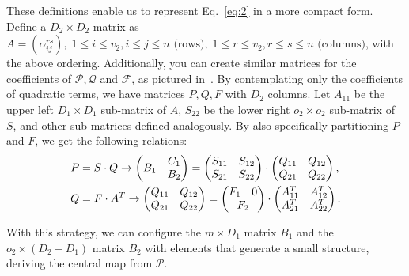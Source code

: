 \documentclass[11pt]{article}
\begin{document}
These definitions enable us to represent Eq.~\ref{eq:2} in a more compact form.
Define a $D_{2} \times D_{2}$ matrix as $A = (\alpha_{ij}^{rs}),\;
1 \leq i \leq v_{2}, i \leq j \leq n \text{ (rows)},\;
1 \leq r \leq v_{2}, r \leq s \leq n \text{ (columns)}$, with the above
ordering. Additionally, you can create similar matrices for the coefficients of
$\mathcal{P}, \mathcal{Q}$ and $\mathcal{F}$, as pictured in~\cite[Figure
7.5]{Petzoldt:phd:2013:jul}. By contemplating only the coefficients of
quadratic terms, we have matrices $P, Q, F$ with $D_{2}$ columns. Let $A_{11}$
be the upper left $D_{1} \times D_{1}$ sub-matrix of $A$, $S_{22}$ be the lower
right $o_{2} \times o_{2}$ sub-matrix of $S$, and other sub-matrices defined
analogously. By also specifically partitioning $P$ and $F$, we get the
following relations:
\begin{align}\label{eq:3}
  P &= S \cdot Q \rightarrow
  \begin{pmatrix}
    B_{1} & \begin{matrix}
      C_{1} \\ B_{2}
    \end{matrix} \\
  \end{pmatrix} =
  \begin{pmatrix}
    S_{11} & S_{12} \\
    S_{21} & S_{22}
  \end{pmatrix} \cdot
  \begin{pmatrix}
    Q_{11} & Q_{12} \\
    Q_{21} & Q_{22}
  \end{pmatrix}, \\
  \label{eq:4}
  Q &= F \cdot A^{T} \rightarrow
  \begin{pmatrix}
    Q_{11} & Q_{12} \\
    Q_{21} & Q_{22}
  \end{pmatrix} =
  \begin{pmatrix}
    F_{1} & 0 \\
    \multicolumn{2}{c}{F_{2}}
  \end{pmatrix} \cdot
  \begin{pmatrix}
    A_{11}^{T} & A_{12}^{T} \\
    A_{21}^{T} & A_{22}^{T}
  \end{pmatrix}.
\end{align}

With this strategy, we can configure the $m \times D_{1}$ matrix $B_{1}$ and
the $o_{2} \times (D_{2} - D_{1})$ matrix $B_{2}$ with elements that generate a
small structure, deriving the central map from $\mathcal{P}$.
\end{document}
